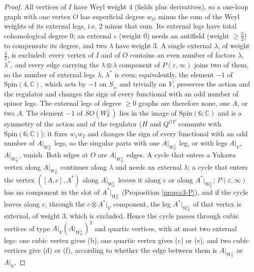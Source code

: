 
\begin{proof}
All vertices of $I$ have Weyl weight $4$ (fields plus derivatives), so a one-loop graph with one vertex $O$ has superficial degree $w_O$ minus the sum of the Weyl weights of its external legs, i.e. $2$ minus that sum. Its external legs have total cohomological degree $0$; an external $c$ (weight $0$) needs an antifield (weight $\ge\frac52$) to compensate its degree, and two $\lambda$ have weight $3$. A single external $\lambda$, of weight $\tfrac32$, is excluded: every vertex of $I$ and of $O$ contains an even number of factors $\lambda$, $\lambda^*$, and every edge carrying the $\lambda\otimes\lambda$ component of $P(\varepsilon,\infty)$ joins two of them, so the number of external legs $\lambda$, $\lambda^*$ is even; equivalently, the element $-1$ of $\mathrm{Spin}(4,\mathbb C)$, which acts by $-1$ on $S_\pm$ and trivially on $V$, preserves the action and the regulator and changes the sign of every functional with an odd number of spinor legs. The external legs of degree $\ge0$ graphs are therefore none, one $A$, or two $A$. The element $-1$ of $SO(W_{\mathbb R}^\perp)$ lies in the image of $\mathrm{Spin}(6;\mathbb C)$ and is a symmetry of the action and of the regulator ($H$ and $Q^{GF}$ commute with $\mathrm{Spin}(6;\mathbb C)$); it fixes $w_1w_2$ and changes the sign of every functional with an odd number of $A|_{W_{\mathbb R}^\perp}$ legs, so the singular parts with one $A|_{W_{\mathbb R}^\perp}$ leg, or with legs $A|_V$, $A|_{W_{\mathbb R}^\perp}$, vanish. Both edges at $O$ are $A|_{W_{\mathbb R}^\perp}$ edges. A cycle that enters a Yukawa vertex along $A|_{W_{\mathbb R}^\perp}$ continues along $\lambda$ and needs an external $\lambda$; a cycle that enters the vertex $([A,c],A^*)$ along $A|_{W_{\mathbb R}^\perp}$ leaves it along $c$ or along $A^*|_{W_{\mathbb R}^\perp}$; $P(\varepsilon,\infty)$ has no component in the slot of $A^*|_{W_{\mathbb R}^\perp}$ (Proposition \ref{prop:c3-P}), and if the cycle leaves along $c$, through the $c\otimes A^*|_V$ component, the leg $A^*|_{W_{\mathbb R}^\perp}$ of that vertex is external, of weight $3$, which is excluded. Hence the cycle passes through cubic vertices of type $A|_V(A|_{W_{\mathbb R}^\perp})^2$ and quartic vertices, with at most two external legs: one cubic vertex gives (b), one quartic vertex gives (c) or (e), and two cubic vertices give (d) or (f), according to whether the edge between them is $A|_{W_{\mathbb R}^\perp}$ or $A|_V$.
\end{proof}

